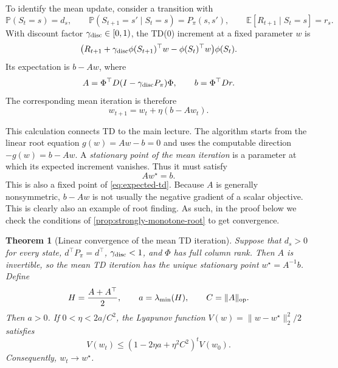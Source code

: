 \documentclass[11pt,twoside]{article}
\newcommand{\E}{\mathbb E}
\renewcommand{\P}{\mathbb P}
\newtheorem{theorem}{Theorem}[section]
\theoremstyle{definition}
\theoremstyle{remark}
\begin{document}
To identify the mean update, consider a transition with
\[
 \P(S_t=s)=d_s,
 \qquad
 \P(S_{t+1}=s'\mid S_t=s)=P_\pi(s,s'),
 \qquad
 \E[R_{t+1}\mid S_t=s]=r_s.
\]
With discount factor $\gamma_{\rm disc}\in[0,1)$, the TD(0) increment at a
fixed parameter $w$ is
\[
 \bigl(R_{t+1}+\gamma_{\rm disc}\phi(S_{t+1})^\top w
       -\phi(S_t)^\top w\bigr)\phi(S_t).
\]
Its expectation is $b-Aw$, where
\begin{equation}
 A=\Phi^\top D(I-\gamma_{\rm disc}P_\pi)\Phi,
 \qquad
 b=\Phi^\top Dr.
 \label{eq:td-matrices}
\end{equation}
The corresponding mean iteration is therefore
\begin{equation}
 w_{t+1}=w_t+\eta(b-Aw_t).
 \label{eq:expected-td}
\end{equation}

This calculation connects TD to the main lecture. The algorithm starts from
the linear root equation $g(w)=Aw-b=0$ and uses the computable direction
$-g(w)=b-Aw$. A \emph{stationary point of the mean iteration} is a parameter
at which its expected increment vanishes. Thus it must satisfy
\[
 Aw^\star=b.
\]
This is also a fixed point of \cref{eq:expected-td}. Because $A$ is generally
nonsymmetric, $b-Aw$ is not usually the negative gradient of a scalar
objective. This is clearly also an example of root finding. As such, in the proof below
we check the conditions of \cref{prop:strongly-monotone-root} to get convergence.
\begin{theorem}[Linear convergence of the mean TD iteration]
\label{thm:mean-td-convergence}
Suppose that $d_s>0$ for every state, $d^\top P_\pi=d^\top$,
$\gamma_{\rm disc}<1$, and $\Phi$ has full column rank. Then $A$ is
invertible, so the mean TD iteration has the unique stationary point
$w^\star=A^{-1}b$. Define
\begin{equation}
 H=\frac{A+A^\top}{2},
 \qquad a=\lambda_{\min}(H),
 \qquad C=\|A\|_{\rm op}.
 \label{eq:td-monotonicity-constants}
\end{equation}
Then $a>0$. If $0<\eta<2a/C^2$, the Lyapunov function
$V(w)=\|w-w^\star\|_2^2/2$ satisfies
\begin{equation}
 V(w_t)
 \le \left(1-2\eta a+\eta^2C^2\right)^t V(w_0).
 \label{eq:mean-td-linear-rate}
\end{equation}
Consequently, $w_t\to w^\star$.
\end{theorem}
\end{document}

